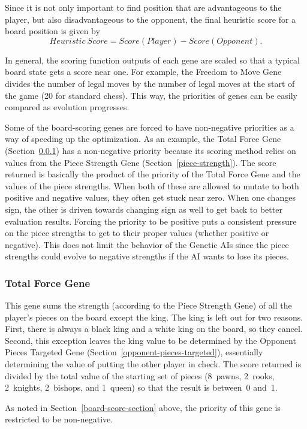 \documentclass[letterpaper]{article}
\renewcommand{\_}{\allowbreak\textunderscore\allowbreak}
\begin{document}
Since it is not only important to find position that are advantageous to the player, but also disadvantageous to the opponent, the final heuristic score for a board position is given by
\[Heuristic\ Score = Score(Player) - Score(Opponent).\]

In general, the scoring function outputs of each gene are scaled so that a typical board state gets a score near one. For example, the Freedom to Move Gene divides the number of legal moves by the number of legal moves at the start of the game (20 for standard chess). This way, the priorities of genes can be easily compared as evolution progresses.

Some of the board-scoring genes are forced to have non-negative priorities as a way of speeding up the optimization. As an example, the Total Force Gene (Section~\ref{total-force}) has a non-negative priority because its scoring method relies on values from the Piece Strength Gene (Section~\ref{piece-strength}). The score returned is basically the product of the priority of the Total Force Gene and the values of the piece strengths. When both of these are allowed to mutate to both positive and negative values, they often get stuck near zero. When one changes sign, the other is driven towards changing sign as well to get back to better evaluation results. Forcing the priority to be positive puts a consistent pressure on the piece strengths to get to their proper values (whether positive or negative). This does not limit the behavior of the Genetic AIs since the piece strengths could evolve to negative strengths if the AI wants to lose its pieces.

\subsubsection{Total Force Gene}\label{total-force}
This gene sums the strength (according to the Piece Strength Gene) of all the player's pieces on the board except the king. The king is left out for two reasons. First, there is always a black king and a white king on the board, so they cancel. Second, this exception leaves the king value to be determined by the Opponent Pieces Targeted Gene (Section~\ref{opponent-pieces-targeted}), essentially determining the value of putting the other player in check. The score returned is divided by the total value of the starting set of pieces (8~pawns, 2~rooks, 2~knights, 2~bishops, and 1~queen) so that the result is between~0 and~1.

As noted in Section~\ref{board-score-section} above, the priority of this gene is restricted to be non-negative.
\end{document}

